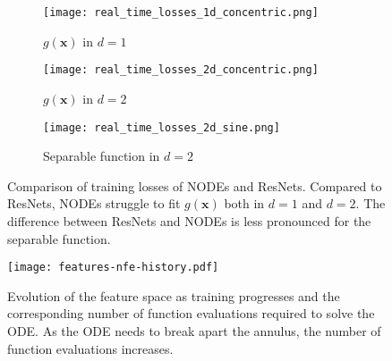 \documentclass{article}
\begin{document}
\begin{figure}[t]
\centering
\begin{subfigure}[t]{0.30\linewidth}
\centering
\texttt{[image: real\_time\_losses\_1d\_concentric.png]}
\setlength{\abovecaptionskip}{-5pt}
\caption{$g(\mathbf{x})$ in $d=1$}
\end{subfigure}\hspace{0.01\linewidth}
\begin{subfigure}[t]{0.31\linewidth}
\centering
\texttt{[image: real\_time\_losses\_2d\_concentric.png]}
\setlength{\abovecaptionskip}{-5pt}
\caption{$g(\mathbf{x})$ in $d=2$}
\end{subfigure}\hspace{0.01\linewidth}
\begin{subfigure}[t]{0.31\linewidth}
\centering
\texttt{[image: real\_time\_losses\_2d\_sine.png]}
\setlength{\abovecaptionskip}{-5pt}
\caption{Separable function in $d=2$}
\end{subfigure}
\setlength{\belowcaptionskip}{-10pt}
\caption{Comparison of training losses of NODEs and ResNets. Compared to ResNets, NODEs struggle to fit $g(\mathbf{x})$ both in $d=1$ and $d=2$. The difference between ResNets and NODEs is less pronounced for the separable function.}
\label{losses-experiments}
\end{figure}

\begin{figure}[h]
\vspace{-5pt}
\begin{center}
\texttt{[image: features-nfe-history.pdf]}
\end{center}
\setlength{\abovecaptionskip}{-5pt}
\setlength{\belowcaptionskip}{-10pt}
\caption{Evolution of the feature space as training progresses and the corresponding number of function evaluations required to solve the ODE. As the ODE needs to break apart the annulus, the number of function evaluations increases.}
\label{feature-space-evolution-nfe}
\end{figure}
\end{document}
